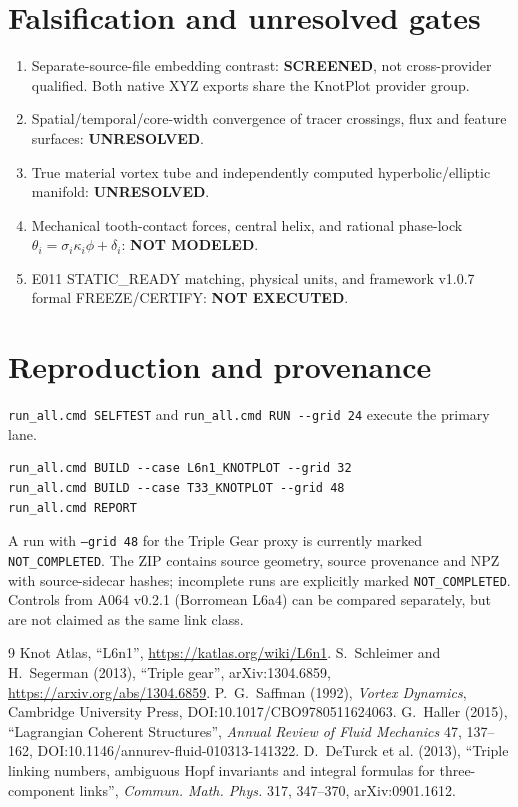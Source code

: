 \documentclass[10pt,a4paper]{article}
\begin{document}
\section{Falsification and unresolved gates}
\begin{enumerate}
\item Separate-source-file embedding contrast: \textbf{SCREENED}, not cross-provider qualified. Both native XYZ exports share the KnotPlot provider group.
\item Spatial/temporal/core-width convergence of tracer crossings, flux and feature surfaces: \textbf{UNRESOLVED}.
\item True material vortex tube and independently computed hyperbolic/elliptic manifold: \textbf{UNRESOLVED}.
\item Mechanical tooth-contact forces, central helix, and rational phase-lock $\theta_i=\sigma_i\kappa_i\phi+\delta_i$: \textbf{NOT MODELED}.
\item E011 STATIC\_READY matching, physical units, and framework v1.0.7 formal FREEZE/CERTIFY: \textbf{NOT EXECUTED}.
\end{enumerate}
\section{Reproduction and provenance}
\verb|run_all.cmd SELFTEST| and \verb|run_all.cmd RUN --grid 24| execute the primary lane.
\begin{verbatim}
run_all.cmd BUILD --case L6n1_KNOTPLOT --grid 32
run_all.cmd BUILD --case T33_KNOTPLOT --grid 48
run_all.cmd REPORT
\end{verbatim}
\noindent A run with \texttt{--grid 48} for the Triple Gear proxy is currently marked \texttt{NOT\_COMPLETED}.
The ZIP contains source geometry, source provenance and NPZ with source-sidecar hashes; incomplete runs are explicitly marked
\texttt{NOT\_COMPLETED}. Controls from A064 v0.2.1 (Borromean L6a4) can be compared separately, but are not claimed as the same link class.
\begin{thebibliography}{9}\small
{} Knot Atlas, ``L6n1'', \url{https://katlas.org/wiki/L6n1}.
 S.~Schleimer and H.~Segerman (2013), ``Triple gear'', arXiv:1304.6859, \url{https://arxiv.org/abs/1304.6859}.
 P.~G.~Saffman (1992), \emph{Vortex Dynamics}, Cambridge University Press, DOI:10.1017/CBO9780511624063.
 G.~Haller (2015), ``Lagrangian Coherent Structures'', \emph{Annual Review of Fluid Mechanics} 47, 137--162, DOI:10.1146/annurev-fluid-010313-141322.
 D.~DeTurck et al. (2013), ``Triple linking numbers, ambiguous Hopf invariants and integral formulas for three-component links'', \emph{Commun. Math. Phys.} 317, 347--370, arXiv:0901.1612.
\end{thebibliography}
\end{document}
